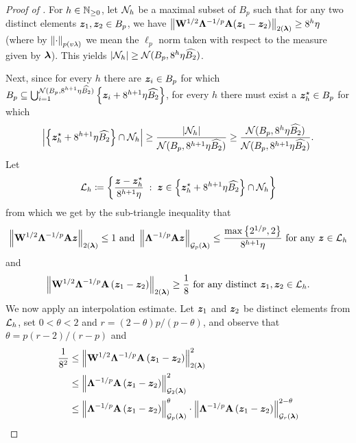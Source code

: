 \documentclass[11pt]{article}
\numberwithin{equation}{section}
\begin{document}
\begin{proof}[Proof of ]
For $h \in \mathbb{N}_{\ge 0}$, let $\mathcal{N}_h$ be a maximal subset of $B_p$ such that for any two distinct elements $\bm{z}_1, \bm{z}_2 \in B_p$, we have $\left\lVert \mathbf{W}^{1/2}\mathbf{\Lambda}^{-1/p}\mathbf{A}(\bm{z}_1-\bm{z}_2) \right\rVert_{2(\bm{\lambda})} \ge 8^h\eta$ (where by $\left\lVert \cdot \right\rVert_{p(v\lambda)}$ we mean the $\ell_p$ norm taken with respect to the measure given by $\bm{\lambda}$). This yields $\left\lvert \mathcal{N}_h \right\rvert \ge \mathcal{N}(B_p, 8^h \eta \widehat{B_2})$.

Next, since for every $h$ there are $\bm{z}_i \in B_p$ for which $B_p \subseteq \bigcup_{i=1}^{\mathcal{N}(B_p,8^{h+1}\eta \widehat{B_2})} \left\{\bm{z}_i + 8^{h+1}\eta \widehat{B_2}\right\}$, for every $h$ there must exist a $\bm{z}^{\star}_h \in B_p$ for which
\begin{align*}
    \left\lvert \left\{\bm{z}^{\star}_h + 8^{h+1} \eta \widehat{B_2}\right\} \cap \mathcal{N}_h \right\rvert \ge \frac{\left\lvert \mathcal{N}_h \right\rvert}{\mathcal{N}(B_p,8^{h+1} \eta \widehat{B_2})} \ge \frac{\mathcal{N}(B_p,8^h \eta \widehat{B_2})}{\mathcal{N}(B_p,8^{h+1} \eta \widehat{B_2})}.
\end{align*}
Let
\begin{align*}
    \mathcal{L}_h \coloneqq \left\{\frac{\bm{z}-\bm{z}^{\star}_h}{8^{h+1} \eta} {\;\; : \;\;} \bm{z} \in \left\{\bm{z}^{\star}_h + 8^{h+1} \eta \widehat{B_2}\right\} \cap \mathcal{N}_h\right\}
\end{align*}
from which we get by the sub-triangle inequality that
\begin{align*}
    \left\lVert \mathbf{W}^{1/2}\mathbf{\Lambda}^{-1/p}\mathbf{A}\bm{z} \right\rVert_{2(\bm{\lambda})} \le 1 \text{ and } \left\lVert \mathbf{\Lambda}^{-1/p}\mathbf{A}\bm{z} \right\rVert_{\mathcal{G}_{p}(\bm{\lambda})} \le \frac{\max\left\{2^{1/p},2\right\}}{8^{h+1} \eta} \text{ for any } \bm{z} \in \mathcal{L}_h
\end{align*}
and
\begin{align*}
    \left\lVert \mathbf{W}^{1/2}\mathbf{\Lambda}^{-1/p}\mathbf{A}\left(\bm{z}_1-\bm{z}_2\right) \right\rVert_{2(\bm{\lambda})} \ge \frac{1}{8} \text{ for any distinct } \bm{z}_1,\bm{z}_2 \in \mathcal{L}_h.
\end{align*}
We now apply an interpolation estimate. Let $\bm{z}_1$ and $\bm{z}_2$ be distinct elements from $\mathcal{L}_h$, set $0<\theta<2$ and $r=(2-\theta)p/(p-\theta)$, and observe that $\theta = p(r-2)/(r-p)$ and 
\begin{align*}
    \frac{1}{8^2} &\le \norm{\mW^{1/2}\mLambda^{-1/p}\mA\inparen{\vz_1-\vz_2}}_{2(\vlambda)}^2 \\
    &\le \gnorml{\mLambda^{-1/p}\mA\inparen{\vz_1-\vz_2}}{2}^2 \\
    &\le \gnorml{\mLambda^{-1/p}\mA\inparen{\vz_1-\vz_2}}{p}^{\theta}\cdot\gnorml{\mLambda^{-1/p}\mA\inparen{\vz_1-\vz_2}}{r}^{2-\theta} \\

\end{align*}
\end{proof}
\end{document}
